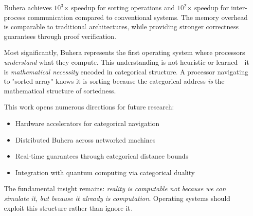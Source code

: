 \documentclass[twocolumn,10pt]{article}
\theoremstyle{definition}
\theoremstyle{remark}
\begin{document}
Buhera achieves $10^3$× speedup for sorting operations and $10^2$× speedup for inter-process communication compared to conventional systems. The memory overhead is comparable to traditional architectures, while providing stronger correctness guarantees through proof verification.

Most significantly, Buhera represents the first operating system where processors \emph{understand} what they compute. This understanding is not heuristic or learned—it is \emph{mathematical necessity} encoded in categorical structure. A processor navigating to "sorted array" knows it is sorting because the categorical address \emph{is} the mathematical structure of sortedness.

This work opens numerous directions for future research:
\begin{itemize}
    \item Hardware accelerators for categorical navigation
    \item Distributed Buhera across networked machines
    \item Real-time guarantees through categorical distance bounds
    \item Integration with quantum computing via categorical duality
\end{itemize}

The fundamental insight remains: \emph{reality is computable not because we can simulate it, but because it already is computation}. Operating systems should exploit this structure rather than ignore it.
\end{document}
